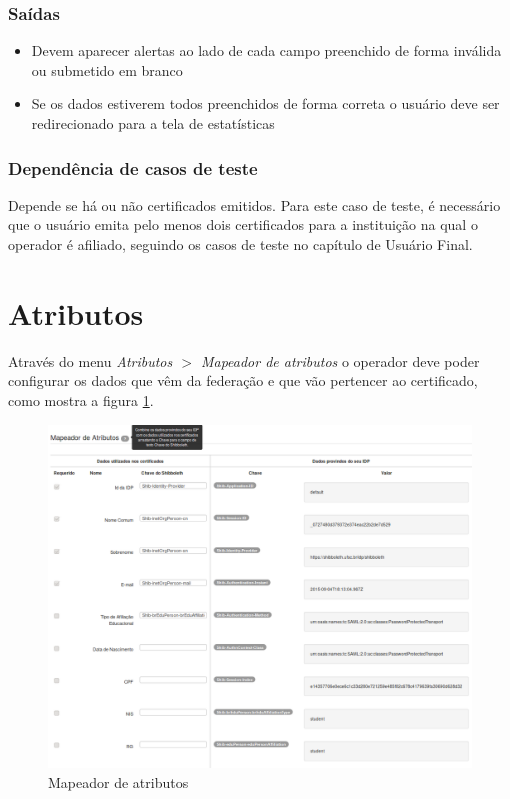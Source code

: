 \subsubsection{Saídas}

\begin{itemize}

	\item Devem aparecer alertas ao lado de cada campo preenchido de forma inválida ou submetido em branco
	\item Se os dados estiverem todos preenchidos de forma correta o usuário deve ser redirecionado para a tela de estatísticas
	
\end{itemize}

\subsubsection{Dependência de casos de teste}
Depende se há ou não certificados emitidos. Para este caso de teste, é necessário que o usuário emita pelo menos dois certificados para a instituição na qual o operador é afiliado, seguindo os casos de teste no capítulo de Usuário Final.

\section{Atributos}

Através do menu \textit{Atributos $>$ Mapeador de atributos} o operador deve poder configurar os dados que vêm da federação e que vão pertencer ao certificado, como mostra a figura \ref{fig:atmapop}.

\begin{figure}[ht]
     \centering
     \includegraphics[scale=0.4]{images/oper_attributesmapper.png}
     \caption{Mapeador de atributos}
     \label{fig:atmapop}
\end{figure}

